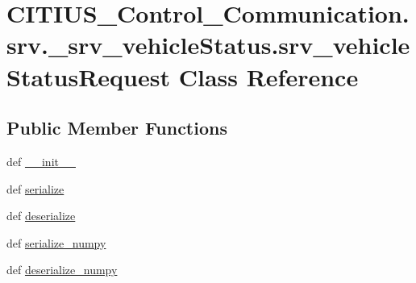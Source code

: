 \hypertarget{class_c_i_t_i_u_s___control___communication_1_1srv_1_1__srv__vehicle_status_1_1srv__vehicle_status_request}{\section{\-C\-I\-T\-I\-U\-S\-\_\-\-Control\-\_\-\-Communication.\-srv.\-\_\-srv\-\_\-vehicle\-Status.\-srv\-\_\-vehicle\-Status\-Request \-Class \-Reference}
\label{class_c_i_t_i_u_s___control___communication_1_1srv_1_1__srv__vehicle_status_1_1srv__vehicle_status_request}
}
\subsection*{\-Public \-Member \-Functions}
\begin{DoxyCompactItemize}
\item 
def \hyperlink{class_c_i_t_i_u_s___control___communication_1_1srv_1_1__srv__vehicle_status_1_1srv__vehicle_status_request_aa628b80fe97eeffbfaf4dbe63426c542}{\-\_\-\-\_\-init\-\_\-\-\_\-}
\item 
def \hyperlink{class_c_i_t_i_u_s___control___communication_1_1srv_1_1__srv__vehicle_status_1_1srv__vehicle_status_request_a04f46f4be08b346926eb7f2b43912ade}{serialize}
\item 
def \hyperlink{class_c_i_t_i_u_s___control___communication_1_1srv_1_1__srv__vehicle_status_1_1srv__vehicle_status_request_ae2b00a8d48d63c631905e869718de05f}{deserialize}
\item 
def \hyperlink{class_c_i_t_i_u_s___control___communication_1_1srv_1_1__srv__vehicle_status_1_1srv__vehicle_status_request_ab3c23981c140077786994703b9062567}{serialize\-\_\-numpy}
\item 
def \hyperlink{class_c_i_t_i_u_s___control___communication_1_1srv_1_1__srv__vehicle_status_1_1srv__vehicle_status_request_ac30bf3301f9042e958e1b2b4b57d7ba9}{deserialize\-\_\-numpy}
\end{DoxyCompactItemize}
